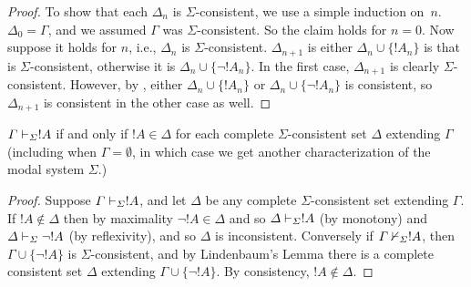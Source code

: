 \documentclass[../../../include/open-logic-section]{subfiles}
\begin{document}
\begin{proof}
To show that each $\Delta_n$ is $\Sigma$-consistent, we use a simple
induction on~$n$. $\Delta_0 = \Gamma$, and we assumed $\Gamma$ was
$\Sigma$-consistent. So the claim holds for $n = 0$. Now suppose it
holds for $n$, i.e., $\Delta_n$ is $\Sigma$-consistent. $\Delta_{n+1}$
is either $\Delta_n \cup \{!A_n\}$ is that is $\Sigma$-consistent,
otherwise it is $\Delta_n \cup \{\lnot!A_n\}$. In the first case,
$\Delta_{n+1}$ is clearly $\Sigma$-consistent. However, by
,
either $\Delta_n \cup \{!A_n\}$ or $\Delta_n \cup \{\lnot!A_n\}$ is
consistent, so $\Delta_{n+1}$ is consistent in the other case as well.
\end{proof}

\begin{cor}
  $\Gamma \Proves[\Sigma] !A$ if and only if $!A \in \Delta$ for
  each  complete $\Sigma$-consistent set $\Delta$ extending $\Gamma$
  (including when $\Gamma = \emptyset$, in which case we get another
  characterization of the modal system $\Sigma$.)
\end{cor}

\begin{proof}
  Suppose $\Gamma \Proves[\Sigma] !A$, and let $\Delta$ be any
  complete $\Sigma$-consistent set extending $\Gamma$. If $!A
  \notin \Delta$ then by maximality $\lnot!A \in \Delta$ and so
  $\Delta \Proves[\Sigma] !A$ (by monotony) and $\Delta
  \Proves[\Sigma] \lnot!A$ (by reflexivity), and so $\Delta$ is
  inconsistent. Conversely if $\Gamma \Proves/[\Sigma] !A$, then
  $\Gamma \cup \{ \lnot!A\}$ is $\Sigma$-consistent, and by
  Lindenbaum's Lemma there is a complete consistent set $\Delta$
  extending $\Gamma \cup \{ \lnot!A \}$. By consistency, $!A
  \notin \Delta$.
\end{proof}
\end{document}
